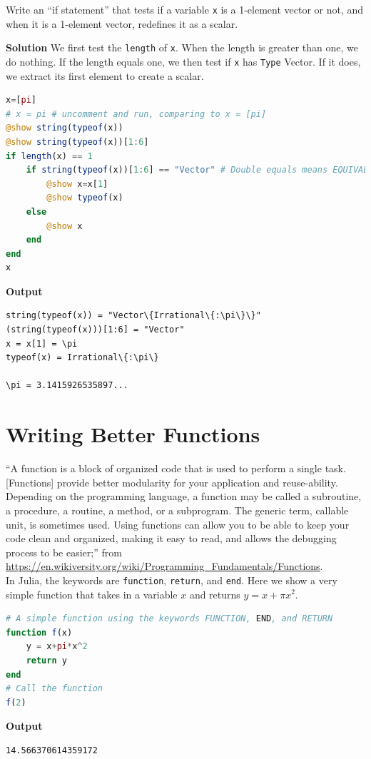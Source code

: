 \begin{example}
Write an ``if statement'' that tests if a variable \texttt{x} is a 1-element vector or not, and when it is a 1-element vector, redefines it as a scalar.
\end{example}

\textbf{Solution}
We first test the \texttt{length} of \texttt{x}. When the length is greater than one, we do nothing. If the length equals one, we then test if \texttt{x} has \texttt{Type} Vector. If it does, we extract its first element to create a scalar.\\


\begin{lstlisting}[language=Julia,style=mystyle]
x=[pi]
# x = pi # uncomment and run, comparing to x = [pi]
@show string(typeof(x))
@show string(typeof(x))[1:6]
if length(x) == 1
    if string(typeof(x))[1:6] == "Vector" # Double equals means EQUIVALENT TO
        @show x=x[1]
        @show typeof(x)
    else
        @show x
    end
end
x
\end{lstlisting}
\textbf{Output} 
\begin{verbatim}
string(typeof(x)) = "Vector\{Irrational\{:\pi\}\}"
(string(typeof(x)))[1:6] = "Vector"
x = x[1] = \pi
typeof(x) = Irrational\{:\pi\}

\pi = 3.1415926535897...
\end{verbatim}

\section{Writing Better Functions}

``A function is a block of organized code that is used to perform a single task. [Functions] provide better modularity for your application and reuse-ability. Depending on the programming language, a function may be called a subroutine, a procedure, a routine, a method, or a subprogram. The generic term, callable unit, is sometimes used. Using functions can allow you to be able to keep your code clean and organized, making it easy to read, and allows the debugging process to be easier;'' from 
\url{https://en.wikiversity.org/wiki/Programming_Fundamentals/Functions}.\\

In Julia, the keywords are \texttt{function}, \texttt{return}, and \texttt{end}. Here we show a very simple function that takes in a variable $x$ and returns $y= x + \pi x^2$.

\begin{lstlisting}[language=Julia,style=mystyle]
# A simple function using the keywords FUNCTION, END, and RETURN
function f(x)
    y = x+pi*x^2
    return y
end
# Call the function
f(2)
\end{lstlisting}
\textbf{Output} 
\begin{verbatim}
14.566370614359172
\end{verbatim}

